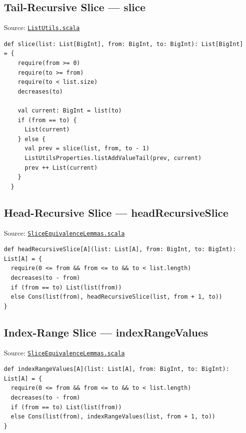 \subsection{Tail-Recursive Slice --- slice}

Source:
\href{https://github.com/thiagomata/prime-numbers/blob/list-article-v1.0.0/src/main/scala/v1/chapter3/list/ListUtils.scala}{\texttt{ListUtils.scala}}

\begin{lstlisting}[style=scala]
  def slice(list: List[BigInt], from: BigInt, to: BigInt): List[BigInt] = {
    require(from >= 0)
    require(to >= from)
    require(to < list.size)
    decreases(to)

    val current: BigInt = list(to)
    if (from == to) {
      List(current)
    } else {
      val prev = slice(list, from, to - 1)
      ListUtilsProperties.listAddValueTail(prev, current)
      prev ++ List(current)
    }
  }
\end{lstlisting}

\subsection{Head-Recursive Slice --- headRecursiveSlice}

Source:
\href{https://github.com/thiagomata/prime-numbers/blob/list-article-v1.0.0/src/main/scala/v1/chapter3/list/properties/SliceEquivalenceLemmas.scala}{\texttt{SliceEquivalenceLemmas.scala}}

\begin{lstlisting}[style=scala]
def headRecursiveSlice[A](list: List[A], from: BigInt, to: BigInt): List[A] = {
  require(0 <= from && from <= to && to < list.length)
  decreases(to - from)
  if (from == to) List(list(from))
  else Cons(list(from), headRecursiveSlice(list, from + 1, to))
}
\end{lstlisting}

\subsection{Index-Range Slice --- indexRangeValues}

Source:
\href{https://github.com/thiagomata/prime-numbers/blob/list-article-v1.0.0/src/main/scala/v1/chapter3/list/properties/SliceEquivalenceLemmas.scala}{\texttt{SliceEquivalenceLemmas.scala}}

\begin{lstlisting}[style=scala]
def indexRangeValues[A](list: List[A], from: BigInt, to: BigInt): List[A] = {
  require(0 <= from && from <= to && to < list.length)
  decreases(to - from)
  if (from == to) List(list(from))
  else Cons(list(from), indexRangeValues(list, from + 1, to))
}
\end{lstlisting}

